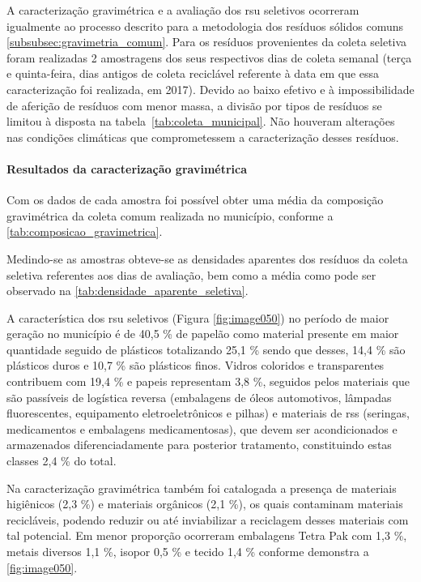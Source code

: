 A caracterização gravimétrica e a avaliação dos \gls{rsu} seletivos ocorreram igualmente ao processo descrito para a metodologia dos resíduos sólidos comuns \ref{subsubsec:gravimetria_comum}. Para os resíduos provenientes da coleta seletiva foram realizadas 2 amostragens dos seus respectivos dias de coleta semanal (terça e quinta-feira, dias antigos de coleta reciclável referente à data em que essa caracterização foi realizada, em 2017). Devido ao baixo efetivo e à impossibilidade de aferição de resíduos com menor massa, a divisão por tipos de resíduos se limitou à disposta na tabela~\ref{tab:coleta_municipal}. Não houveram alterações nas condições climáticas que comprometessem a caracterização desses resíduos.




\paragraph{\textbf{Resultados da caracterização gravimétrica}}

Com os dados de cada amostra foi possível obter uma média da composição gravimétrica da coleta comum realizada no município, conforme a \autoref{tab:composicao_gravimetrica}.



Medindo-se as amostras obteve-se as densidades aparentes dos resíduos da coleta seletiva referentes aos dias de avaliação, bem como a média como pode ser observado na \autoref{tab:densidade_aparente_seletiva}.



A característica dos \gls{rsu} seletivos (Figura \ref{fig:image050}) no período de maior geração no município é de 40,5 \% de papelão como material presente em maior quantidade seguido de plásticos totalizando 25,1 \% sendo que desses, 14,4 \% são plásticos duros e 10,7 \% são plásticos finos. Vidros coloridos e transparentes contribuem com 19,4 \% e papeis representam 3,8 \%, seguidos pelos materiais que são passíveis de logística reversa (embalagens de óleos automotivos, lâmpadas fluorescentes, equipamento eletroeletrônicos e pilhas) e materiais de \gls{rss} (seringas, medicamentos e embalagens medicamentosas), que devem ser acondicionados e armazenados diferenciadamente para posterior tratamento, constituindo estas classes 2,4 \% do total. 

Na caracterização gravimétrica também foi catalogada a presença de materiais higiênicos (2,3 \%) e materiais orgânicos (2,1 \%), os quais contaminam materiais recicláveis, podendo reduzir ou até inviabilizar a reciclagem desses materiais com tal potencial. Em menor proporção ocorreram embalagens Tetra Pak com 1,3 \%, metais diversos 1,1 \%, isopor 0,5 \% e tecido 1,4 \% conforme demonstra a \autoref{fig:image050}.

